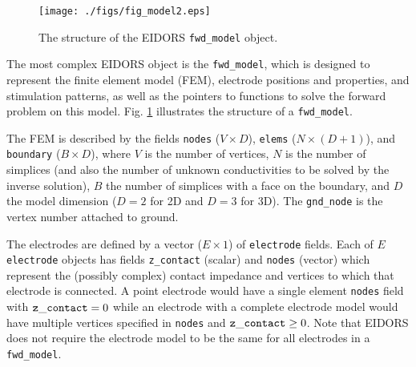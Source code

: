 \documentclass[12pt]{iopart}
\begin{document}
%
%
\begin{figure}[th]
\begin{flushright}
\texttt{[image: ./figs/fig\_model2.eps]}
\caption{\small The structure of the EIDORS {\tt fwd\_model} object.
\label{fig:fwd_model}
 }
\end{flushright}
\end{figure}


The most complex EIDORS object is the {\tt fwd\_model},
which is designed to represent the finite element model 
(FEM), electrode
positions and properties, and stimulation patterns, as
well as the pointers to functions to solve the forward
problem on this model. Fig. \ref{fig:fwd_model} illustrates
the structure of a {\tt fwd\_model}.

The FEM is described by the fields
{\tt nodes} ($V{\times}D$),
{\tt elems} ($N{\times}(D+1)$), and
{\tt boundary} ($B{\times}D$), where
$V$ is the number of vertices, $N$ is the number of
simplices (and also the number of unknown conductivities
to be solved by the inverse solution), $B$ the number
of simplices with a face on the boundary, and $D$ the
model dimension ($D=2$ for 2D and $D=3$ for 3D).
The {\tt gnd\_node} is the vertex number attached to ground.

The electrodes are defined by a vector ($E\times1$) of
{\tt electrode} fields. Each of $E$ {\tt electrode}
objects has fields
{\tt z\_contact} (scalar) and {\tt nodes} (vector)
 which represent the
(possibly complex) contact impedance
and vertices to which that electrode is connected.
A point electrode would have a single element
{\tt nodes} field with ${\tt z\_contact}=0$ while
an electrode with a complete electrode model
would have multiple vertices specified in {\tt nodes}
and ${\tt z\_contact}\ge0$. Note that EIDORS
does not require the electrode model to be the same
for all electrodes in a {\tt fwd\_model}.
\end{document}

